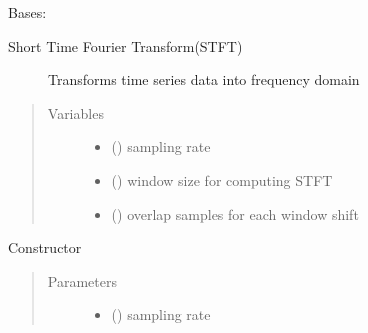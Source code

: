 \documentclass[letterpaper,10pt,english]{sphinxmanual}
\begin{document}
\begin{fulllineitems}
\label{\detokenize{docs/source/preprocess:preprocess.preprocess_tools.STFT}}
Bases: 
\begin{description}
\item[{Short Time Fourier Transform(STFT)}] \leavevmode
Transforms time series data into frequency domain

\end{description}
\begin{quote}\begin{description}
\item[{Variables}] \leavevmode\begin{itemize}
\item {} 
 () \textendash{} sampling rate

\item {} 
 () \textendash{} window size for computing STFT

\item {} 
 () \textendash{} overlap samples for each window shift

\end{itemize}

\end{description}\end{quote}

\begin{fulllineitems}
\label{\detokenize{docs/source/preprocess:preprocess.preprocess_tools.STFT.__init__}}
Constructor
\begin{quote}\begin{description}
\item[{Parameters}] \leavevmode\begin{itemize}
\item {} 
 () \textendash{} sampling rate


\end{itemize}
\end{description}
\end{quote}
\end{fulllineitems}
\end{fulllineitems}
\end{document}
